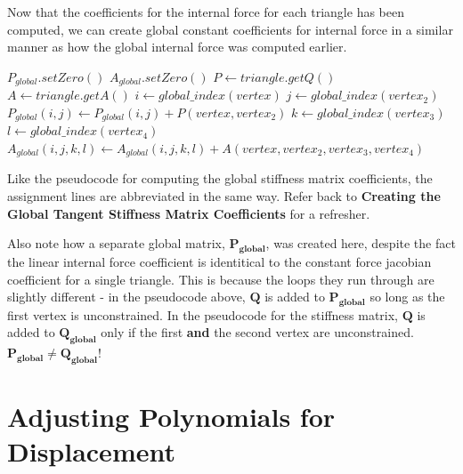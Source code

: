 \documentclass[twocolumn,10pt]{asme2ej}
\begin{document}
Now that the coefficients for the internal force for each triangle has been computed, we can create global constant coefficients for internal force in a similar manner as how the global internal force was computed earlier.

\begin{algorithmic}[1]
        \State $P_{global}.setZero()$
        \State $A_{global}.setZero()$
         \State $P \gets triangle.getQ()$
         \State $A \gets triangle.getA()$
                  \State $i \gets global\_index(vertex)$
                    \State $j \gets global\_index(vertex_2)$
                    \State $P_{global}(i,j) \gets P_{global}(i,j) + P(vertex, vertex_2)$
                          \State $k \gets global\_index(vertex_3)$
                              \State $l \gets global\_index(vertex_4)$
                              \State $A_{global}(i,j,k,l)  \gets A_{global}(i,j,k,l)+A(vertex, vertex_2, vertex_3, vertex_4)$
                            \EndFor
                      \EndFor
                    \EndFor
              \EndIf
            \EndFor
        \EndFor
    \EndFunction
\end{algorithmic}

Like the pseudocode for computing the global stiffness matrix coefficients, the assignment lines are abbreviated in the same way. Refer back to \textbf{Creating the Global Tangent Stiffness Matrix Coefficients} for a refresher.

Also note how a separate global matrix, $\bm{P_{global}}$, was created here, despite the fact the linear internal force coefficient is identitical to the constant force jacobian coefficient for a single triangle. This is because the loops they run through are slightly different - in the pseudocode above, $\bm{Q}$ is added to $\bm{P_{global}}$ so long as the first vertex is unconstrained. In the pseudocode for the stiffness matrix, $\bm{Q}$ is added to $\bm{Q_{global}}$ only if the first \textbf{and} the second vertex are unconstrained. $\bm{P_{global}} \neq \bm{Q_{global}}$!

\section{Adjusting Polynomials for Displacement}
\end{document}
